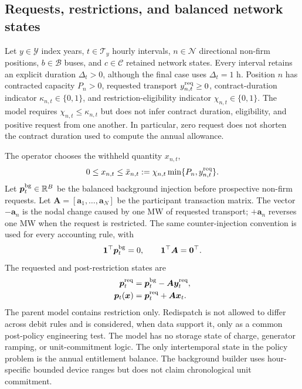 \documentclass[10pt,journal]{IEEEtran}
\newcommand{\R}{\mathbb{R}}
\newcommand{\one}{\mathbf{1}}
\begin{document}
\subsection{Requests, restrictions, and balanced network states}

Let $y\in\mathcal Y$ index years, $t\in\mathcal T_y$ hourly intervals, $n\in\mathcal N$ directional non-firm positions, $b\in\mathcal B$ buses, and $c\in\mathcal C$ retained network states. Every interval retains an explicit duration $\Delta_t>0$, although the final case uses $\Delta_t=1$ h. Position $n$ has contracted capacity $P_n>0$, requested transport $y^{\rm req}_{n,t}\geq0$, contract-duration indicator $\kappa_{n,t}\in\{0,1\}$, and restriction-eligibility indicator $\chi_{n,t}\in\{0,1\}$. The model requires $\chi_{n,t}\leq\kappa_{n,t}$ but does not infer contract duration, eligibility, and positive request from one another. In particular, zero request does not shorten the contract duration used to compute the annual allowance.

The operator chooses the withheld quantity $x_{n,t}$,
\begin{equation}
0\leq x_{n,t}\leq \bar x_{n,t}:=
\chi_{n,t}\min\{P_n,y^{\rm req}_{n,t}\}.
\label{eq:xbar}
\end{equation}
Let $\bm p_t^{\rm bg}\in\R^{B}$ be the balanced background injection before prospective non-firm requests. Let $\bm A=[\bm a_1,\ldots,\bm a_N]$ be the participant transaction matrix. The vector $-\bm a_n$ is the nodal change caused by one MW of requested transport; $+\bm a_n$ reverses one MW when the request is restricted. The same counter-injection convention is used for every accounting rule, with
\begin{equation}
\one^\top\bm p_t^{\rm bg}=0,
\qquad
\one^\top\bm A=\bm0^\top.
\label{eq:balance}
\end{equation}
The requested and post-restriction states are
\begin{align}
\bm p_t^{\rm req}
&=\bm p_t^{\rm bg}-\bm A\bm y_t^{\rm req},
\notag\\
\bm p_t(\bm x)
&=\bm p_t^{\rm req}+\bm A\bm x_t.
\label{eq:nodal_state}
\end{align}
The parent model contains restriction only. Redispatch is not allowed to differ across debit rules and is considered, when data support it, only as a common post-policy engineering test. The model has no storage state of charge, generator ramping, or unit-commitment logic. The only intertemporal state in the policy problem is the annual entitlement balance. The background builder uses hour-specific bounded device ranges but does not claim chronological unit commitment.
\end{document}
